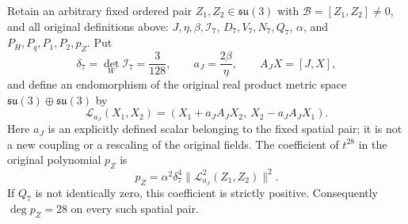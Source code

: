 \begin{proposition}
\label{q444:finite-coupling-exact-degree}
Retain an arbitrary fixed ordered pair
$Z_1,Z_2\in\mathfrak{su}(3)$ with $\mathscr B=[Z_1,Z_2]\ne0$,
and all original definitions above: $J,\eta,\beta,\mathcal I_7$,
$D_7,V_7,N_7,Q_7$, $\alpha$, and $P_H,P_q,P_1,P_2,p_Z$.
Put
\[
 \delta_7=\det_W\mathcal I_7=\frac3{128},\qquad
 a_J=\frac{2\beta}{\eta},\qquad A_JX=[J,X],
\]
and define an endomorphism of the original real product metric space
$\mathfrak{su}(3)\oplus\mathfrak{su}(3)$ by
\[
 \mathcal L_{a_J}(X_1,X_2)
    =(X_1+a_J A_JX_2,\ X_2-a_J A_JX_1).
\]
Here $a_J$ is an explicitly defined scalar belonging to the fixed spatial
pair; it is not a new coupling or a rescaling of the original fields.
The coefficient of $t^{28}$ in the original polynomial $p_Z$ is
\begin{equation}
 [t^{28}]p_Z
 =\alpha^2\delta_7^4
   \bigl\|\mathcal L_{a_J}^2(Z_1,Z_2)\bigr\|^2.
 \label{q444:audit-exact-leading-coefficient}
\end{equation}
If $Q_7$ is not identically zero, this coefficient is strictly positive.
Consequently $\deg p_Z=28$ on every such spatial pair.
\end{proposition}
